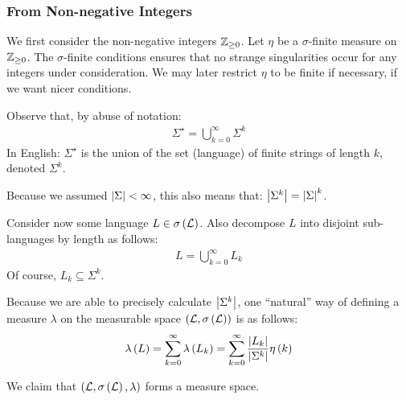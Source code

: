 \subsubsection{From Non-negative Integers}
We first consider the non-negative integers \(\mathbb{Z}_{\geq 0}\).
Let \(\eta\) be a \(\sigma\)-finite measure on \(\mathbb{Z}_{\geq 0}\).
The \(\sigma\)-finite conditions ensures that no strange singularities
occur for any integers under consideration.
We may later restrict \(\eta\) to be finite if necessary,
if we want nicer conditions.

Observe that, by abuse of notation:
\begin{align*}
  \Sigma^\star =
    \bigcup_{k = 0}^{\infty} \Sigma^k
\end{align*}
In English: \(\Sigma^\star\) is the union of the set (language) of finite
strings of length \(k\), denoted \(\Sigma^k\).

Because we assumed \(\left\lvert\Sigma\right\rvert < \infty\), this also means that:
\(\left\lvert\Sigma^k\right\rvert = \left\lvert\Sigma\right\rvert^k\).

Consider now some language \(L \in \sigma\left(\mathcal{L}\right)\).
Also decompose \(L\) into disjoint sub-languages by length as follows:
\begin{align*}
  L = \bigcup_{k = 0}^{\infty} L_k
\end{align*}
Of course, \(L_k \subseteq \Sigma^k\).

Because we are able to precisely calculate \(\left\lvert\Sigma^k\right\rvert\),
one ``natural'' way of defining a measure \(\lambda\) on
the measurable space \(\left(\mathcal{L}, \sigma\left(\mathcal{L}\right)\right)\)
is as follows:
\begin{align*}
  \lambda\left(L\right)
    = \sum_{k = 0}^{\infty} \lambda\left(L_k\right)
    = \sum_{k = 0}^{\infty} \frac{\left\lvert L_k\right\rvert}{\left\lvert\Sigma^k\right\rvert} \eta\left(k\right)
\end{align*}

We claim that \(\left(\mathcal{L}, \sigma\left(\mathcal{L}\right), \lambda\right)\)
forms a measure space.

